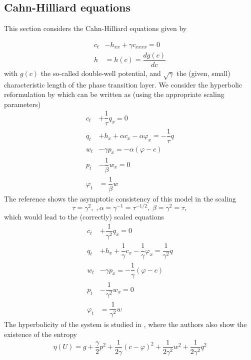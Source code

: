 \documentclass{article}
\theoremstyle{plain}
\theoremstyle{definition}
\numberwithin{theorem}{section}
\begin{document}
\subsection{Cahn-Hilliard equations}

This section considers the Cahn-Hilliard equations given by

\begin{subequations} \label{CaHi}
\begin{align}
c_t  & -  h_{xx} +\gamma c_{xxxx} =0\\
h &=h(c) = \dfrac{dg(c)}{dc}
\end{align}
\end{subequations}
with $g(c)$ the so-called  double-well potential, and $\sqrt{\gamma}$   the (given, small) characteristic length of  the phase transition layer.
We consider the hyperbolic reformulation by \cite{dhaouadi25} which can be written as (using the appropriate scaling parameters)
\begin{subequations} \label{hCaHi}
\begin{align}
c_t  &  +\dfrac{1}{\tau} q_x =0\\
q_t  &  + h_x +\alpha c_x- \alpha\varphi_x = - \dfrac{1}{\tau} q\\
w_t  &  -  \gamma p_x =  -\alpha (\varphi-c)\\
p_t  &  -   \dfrac{1}{\beta} w_x =0\\
\varphi_t &  =   \dfrac{1}{\beta} w
\end{align}
\end{subequations}
The reference shows the asymptotic consistency of this model in the scaling
$$\tau = \gamma^2,\;, \alpha=\gamma^{-1} = \tau^{-1/2},\; \beta =\gamma^2 = \tau,$$
which would lead to  the  (correctly) scaled equations
\begin{subequations} \label{hCaHi1}
\begin{align}
c_t  &  +\dfrac{1}{\gamma^2} q_x =0\\
q_t  &  + h_x +\dfrac{1}{\gamma} c_x- \dfrac{1}{\gamma}\varphi_x =  \dfrac{1}{\gamma^2} q\\
w_t  &  -  \gamma p_x = - \dfrac{1}{\gamma} (\varphi-c)\\
p_t  &  -   \dfrac{1}{\gamma^2} w_x =0\\
\varphi_t &  =   \dfrac{1}{\gamma^2} w
\end{align}
\end{subequations}
The hyperbolicity of the system is studied in \cite{dhaouadi25}, where the authors also show the existence of the entropy
$$
\eta(U) = g +\dfrac{\gamma}{2}p^2 + \dfrac{1}{2\gamma } (c-\varphi)^2  + \dfrac{1}{2\gamma^2}w^2 +  \dfrac{1}{2\gamma^2}q^2
$$
\end{document}
